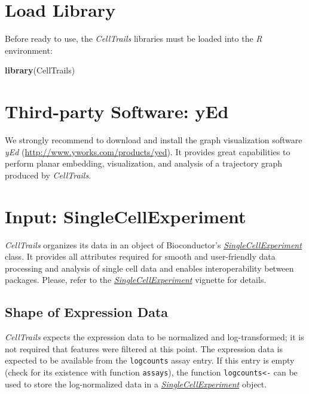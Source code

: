 \documentclass[]{book}
\newenvironment{Shaded}{\begin{snugshade}}{\end{snugshade}}
\newcommand{\KeywordTok}[1]{\textcolor[rgb]{0.13,0.29,0.53}{\textbf{#1}}}
\newcommand{\NormalTok}[1]{#1}
\theoremstyle{definition}
\theoremstyle{definition}
\theoremstyle{definition}
\theoremstyle{remark}
\begin{document}
\section{Load Library}\label{load-library}

Before ready to use, the \emph{CellTrails} libraries must be loaded into
the \emph{R} environment:

\begin{Shaded}
\begin{Highlighting}[]
\KeywordTok{library}\NormalTok{(CellTrails)}
\end{Highlighting}
\end{Shaded}

\section{Third-party Software: yEd}\label{third-party-software-yed}

We strongly recommend to download and install the graph visualization
software \emph{yEd} (\url{http://www.yworks.com/products/yed}). It
provides great capabilities to perform planar embedding, visualization,
and analysis of a trajectory graph produced by \emph{CellTrails}.

\section{Input: SingleCellExperiment}\label{input-singlecellexperiment}

\emph{CellTrails} organizes its data in an object of Bioconductor's
\emph{\href{http://bioconductor.org/packages/SingleCellExperiment}{SingleCellExperiment}}
\citep{R-SingleCellExperiment} class. It provides all attributes
required for smooth and user-friendly data processing and analysis of
single cell data and enables interoperability between packages. Please,
refer to the
\emph{\href{http://bioconductor.org/packages/SingleCellExperiment}{SingleCellExperiment}}
vignette for details.

\subsection{Shape of Expression Data}\label{shape-of-expression-data}

\emph{CellTrails} expects the expression data to be normalized and
log-transformed; it is not required that features were filtered at this
point. The expression data is expected to be available from the
\texttt{logcounts} assay entry. If this entry is empty (check for its
existence with function \texttt{assays}), the function
\texttt{logcounts\textless{}-} can be used to store the log-normalized
data in a
\emph{\href{http://bioconductor.org/packages/SingleCellExperiment}{SingleCellExperiment}}
object.
\end{document}
